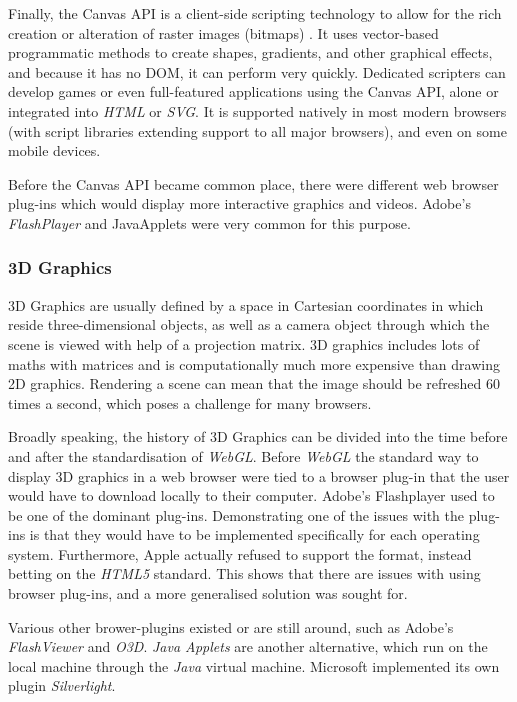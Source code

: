 \documentclass[a4paper,11pt,titlepage]{article}
\begin{document}
Finally, the Canvas API is a client-side scripting technology to allow for the rich creation or alteration of raster images (bitmaps) . It uses vector-based programmatic methods to create shapes, gradients, and other graphical effects, and because it has no DOM, it can perform very quickly. Dedicated scripters can develop games or even full-featured applications using the Canvas API, alone or integrated into \textit{HTML} or \textit{SVG}. It is supported natively in most modern browsers (with script libraries extending support to all major browsers), and even on some mobile devices.

Before the Canvas API became common place, there were different web browser plug-ins which would display more interactive graphics and videos. Adobe's \textit{FlashPlayer} and JavaApplets were very common for this purpose.
\subsubsection{3D Graphics}

3D Graphics are usually defined by a space in Cartesian coordinates in which reside three-dimensional objects, as well as a camera object through which the scene is viewed with help of a projection matrix. 3D graphics includes lots of maths with matrices and is computationally much more expensive than drawing 2D graphics. Rendering a scene can mean that the image should be refreshed 60 times a second, which poses a challenge for many browsers.

Broadly speaking, the history of 3D Graphics can be divided into the time before and after the standardisation of \textit{WebGL}. Before \textit{WebGL} the standard way to display 3D graphics in a web browser were tied to a browser plug-in that the user would have to download locally to their computer. Adobe's Flashplayer used to be one of the dominant plug-ins. Demonstrating one of the issues with the plug-ins is that they would have to be implemented specifically for each operating system. Furthermore, Apple actually refused to support the format, instead betting on the \textit{HTML5} standard. This shows that there are issues with using browser plug-ins, and a more generalised solution was sought for.

Various other brower-plugins existed or are still around, such as Adobe's \textit{FlashViewer} and \textit{O3D}. \textit{Java Applets} are another alternative, which run on the local machine through the \textit{Java} virtual machine. Microsoft implemented its own plugin \textit{Silverlight}.
\end{document}

